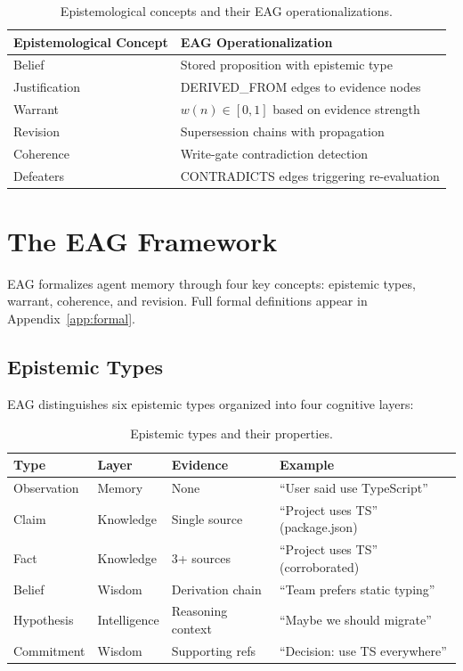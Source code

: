 \documentclass[11pt,letterpaper]{article}
\begin{document}
\begin{table}[H]
\centering
\caption{Epistemological concepts and their EAG operationalizations.}
\label{tab:concepts}
\begin{tabular}{@{}ll@{}}
\toprule
\textbf{Epistemological Concept} & \textbf{EAG Operationalization} \\
\midrule
Belief & Stored proposition with epistemic type \\
Justification & DERIVED\_FROM edges to evidence nodes \\
Warrant & $w(n) \in [0,1]$ based on evidence strength \\
Revision & Supersession chains with propagation \\
Coherence & Write-gate contradiction detection \\
Defeaters & CONTRADICTS edges triggering re-evaluation \\
\bottomrule
\end{tabular}
\end{table}

\section{The EAG Framework}
\label{sec:eag}

EAG formalizes agent memory through four key concepts: epistemic types, warrant, coherence, and revision. Full formal definitions appear in Appendix~\ref{app:formal}.

\subsection{Epistemic Types}

EAG distinguishes six epistemic types organized into four cognitive layers:

\begin{table}[H]
\centering
\caption{Epistemic types and their properties.}
\label{tab:types}
\begin{tabular}{@{}lllp{4cm}@{}}
\toprule
\textbf{Type} & \textbf{Layer} & \textbf{Evidence} & \textbf{Example} \\
\midrule
Observation & Memory & None & ``User said use TypeScript'' \\
Claim & Knowledge & Single source & ``Project uses TS'' (package.json) \\
Fact & Knowledge & 3+ sources & ``Project uses TS'' (corroborated) \\
Belief & Wisdom & Derivation chain & ``Team prefers static typing'' \\
Hypothesis & Intelligence & Reasoning context & ``Maybe we should migrate'' \\
Commitment & Wisdom & Supporting refs & ``Decision: use TS everywhere'' \\
\bottomrule
\end{tabular}
\end{table}
\end{document}
